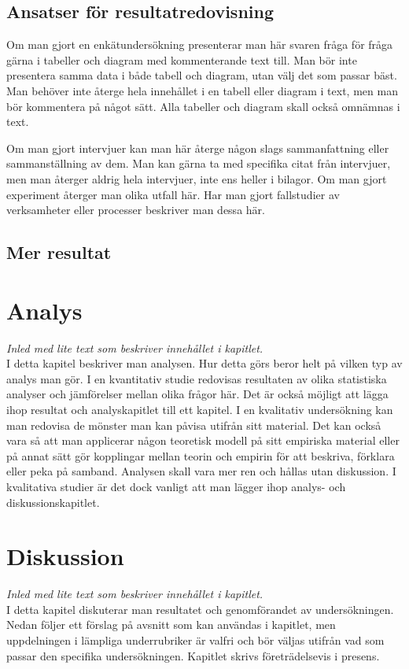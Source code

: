 \documentclass[a4paper,12pt]{article} %
\begin{document}
\subsection{Ansatser för resultatredovisning}
Om man gjort en enkätundersökning presenterar man här svaren fråga för fråga gärna i tabeller och diagram med kommenterande text till. Man bör inte presentera samma data i både tabell och diagram, utan välj det som passar bäst. Man behöver inte återge hela innehållet i en tabell eller diagram i text, men man bör kommentera på något sätt. Alla tabeller och diagram skall också omnämnas i text. 

Om man gjort intervjuer kan man här återge någon slags sammanfattning eller sammanställning av dem. Man kan gärna ta med specifika citat från intervjuer, men man återger aldrig hela intervjuer, inte ens heller i bilagor. Om man gjort experiment återger man olika utfall här. Har man gjort fallstudier av verksamheter eller processer beskriver man dessa här.  

\subsection{Mer resultat}	

\newpage
	
\section{Analys}
\emph{Inled med lite text som beskriver innehållet i kapitlet.}\\
I detta kapitel beskriver man analysen. Hur detta görs beror helt på vilken typ av analys man gör. I en kvantitativ studie redovisas resultaten av olika statistiska analyser och jämförelser mellan olika frågor här. Det är också möjligt att lägga ihop resultat och analyskapitlet till ett kapitel. I en kvalitativ undersökning kan man redovisa de mönster man kan påvisa utifrån sitt material. Det kan också vara så att man applicerar någon teoretisk modell på sitt empiriska material eller på annat sätt gör kopplingar mellan teorin och empirin för att beskriva, förklara eller peka på samband. Analysen skall vara mer ren och hållas utan diskussion. I kvalitativa studier är det dock vanligt att man lägger ihop analys- och diskussionskapitlet. 
	
\newpage
	
\section{Diskussion}
\emph{Inled med lite text som beskriver innehållet i kapitlet.}\\
I detta kapitel diskuterar man resultatet och genomförandet av undersökningen. Nedan följer ett förslag på avsnitt som kan användas i kapitlet, men uppdelningen i lämpliga underrubriker är valfri och bör väljas utifrån vad som passar den specifika undersökningen. Kapitlet skrivs företrädelsevis i presens.
\end{document}
